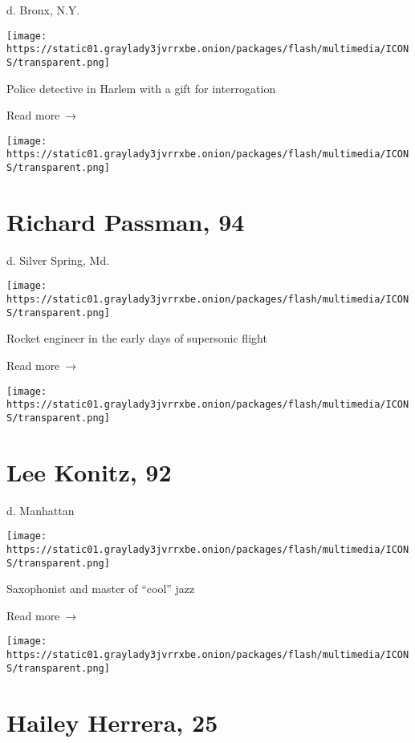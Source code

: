 d. Bronx, N.Y.

\texttt{[image: https://static01.graylady3jvrrxbe.onion/packages/flash/multimedia/ICONS/transparent.png]}

Police detective in Harlem with a gift for interrogation

 Read more~→

\href{https://www.nytimes3xbfgragh.onion/2020/04/16/obituaries/richard-passman-dead-coronavirus.html}{}

\texttt{[image: https://static01.graylady3jvrrxbe.onion/packages/flash/multimedia/ICONS/transparent.png]}

\hypertarget{richard-passman-94}{%
\section{Richard Passman, 94}\label{richard-passman-94}}

d. Silver Spring, Md.

\texttt{[image: https://static01.graylady3jvrrxbe.onion/packages/flash/multimedia/ICONS/transparent.png]}

Rocket engineer in the early days of supersonic flight

 Read more~→

\href{https://www.nytimes3xbfgragh.onion/2020/04/16/arts/music/lee-konitz-dead-coronavirus.html}{}

\texttt{[image: https://static01.graylady3jvrrxbe.onion/packages/flash/multimedia/ICONS/transparent.png]}

\hypertarget{lee-konitz-92}{%
\section{Lee Konitz, 92}\label{lee-konitz-92}}

d. Manhattan

\texttt{[image: https://static01.graylady3jvrrxbe.onion/packages/flash/multimedia/ICONS/transparent.png]}

Saxophonist and master of ``cool'' jazz

 Read more~→

\href{https://www.nytimes3xbfgragh.onion/2020/04/15/nyregion/hailey-herrera-dead-coronavirus.html}{}

\texttt{[image: https://static01.graylady3jvrrxbe.onion/packages/flash/multimedia/ICONS/transparent.png]}

\hypertarget{hailey-herrera-25}{%
\section{Hailey Herrera, 25}\label{hailey-herrera-25}}

